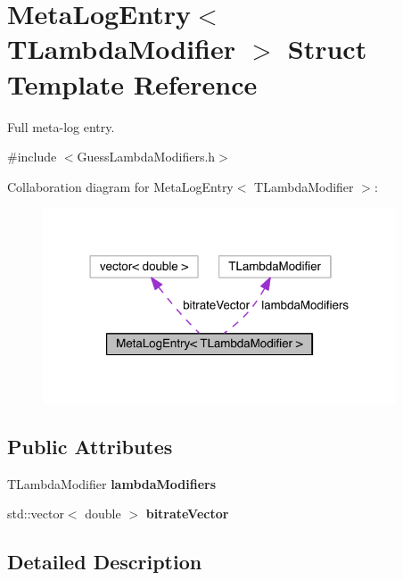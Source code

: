 \hypertarget{struct_meta_log_entry}{}\section{Meta\+Log\+Entry$<$ T\+Lambda\+Modifier $>$ Struct Template Reference}
\label{struct_meta_log_entry}


Full meta-\/log entry.  




{\ttfamily \#include $<$Guess\+Lambda\+Modifiers.\+h$>$}



Collaboration diagram for Meta\+Log\+Entry$<$ T\+Lambda\+Modifier $>$\+:
\nopagebreak
\begin{figure}[H]
\begin{center}
\leavevmode
\includegraphics[width=297pt]{de/dc8/struct_meta_log_entry__coll__graph}
\end{center}
\end{figure}
\subsection*{Public Attributes}
\begin{DoxyCompactItemize}
\item 
\mbox{\label{struct_meta_log_entry_a494dc8b5757c8b0411c95d2998492cbf}} 
T\+Lambda\+Modifier {\bfseries lambda\+Modifiers}
\item 
\mbox{\label{struct_meta_log_entry_af7f96ccf26841875ab7091cea40f4321}} 
std\+::vector$<$ double $>$ {\bfseries bitrate\+Vector}
\end{DoxyCompactItemize}


\subsection{Detailed Description}
